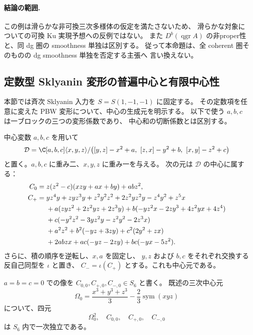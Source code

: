 \paragraph{結論の範囲.}
この例は滑らかな非可換三次多様体の仮定を満たさないため、
滑らかな対象についての可換 Ku 実現予想への反例ではない。
また $D^b(\operatorname{qgr}A)$ の非proper性と、同 dg 圏の smoothness 単独は区別する。
従って本命題は、全 coherent 圏そのものの dg smoothness 単独を否定する主張へ
言い換えない。


\subsection{定数型 Sklyanin 変形の普遍中心と有限中心性}
\label{cmo:subsec:pi-center}

本節では斉次 Sklyanin 入力を $S=S(1,-1,-1)$ に固定する。
その定数項を任意に変えた PBW 変形について、中心の生成元を明示する。
以下で使う $a,b,c$ は一ブロックの三つの変形係数であり、
中心和の切断係数とは区別する。

\begin{lemma}[普遍六次中心元]\label{cmo:lem:universal-sixth-center}
中心変数 $a,b,c$ を用いて
\[
 \mathcal D=\C[a,b,c]\langle x,y,z\rangle/
 \bigl([y,z]-x^2+a,\ [z,x]-y^2+b,\ [x,y]-z^2+c\bigr)
\]
と置く。$a,b,c$ に重み二、$x,y,z$ に重み一を与える。
次の元は $\mathcal D$ の中心に属する：
\begin{align}
 C_0={}&z(z^2-c)(xzy+ax+by)+abz^2,
 \label{cmo:eq:center-six-zero}\\
 C_+={}&yz^4y+zyz^3y+z^2y^2z^2+2z^2yz^2y-z^4y^2+z^5x
 \notag\\
 &+a(zyz^2+2z^2yz+2z^3y)
   +b(-yz^2x-2zy^3+4z^2yx+4z^4)
 \notag\\
 &+c(-y^2z^2-3yz^2y-z^2y^2-2z^3x)
 \notag\\
 &+a^2z^2+b^2(-yz+3zy)+c^2(2y^2+zx)
 \notag\\
 &+2abzx+ac(-yz-2zy)+bc(-yx-5z^2).
 \label{cmo:eq:center-six-positive}
\end{align}
さらに、積の順序を逆転し、$x,a$ を固定し、
$y,z$ および $b,c$ をそれぞれ交換する反自己同型を $\iota$ と置き、
$C_-=\iota(C_+)$ とする。これも中心元である。

$a=b=c=0$ での像を $C_{0,0},C_{+,0},C_{-,0}\in S_6$ と書く。
既述の三次中心元
\[
 \Omega_0=\frac{x^3+y^3+z^3}{3}-\frac23\operatorname{sym}(xyz)
\]
について、四元
\begin{equation}\label{cmo:eq:sixth-center-basis}
 \Omega_0^2,\quad C_{0,0},\quad C_{+,0},\quad C_{-,0}
\end{equation}
は $S_6$ 内で一次独立である。
\end{lemma}


